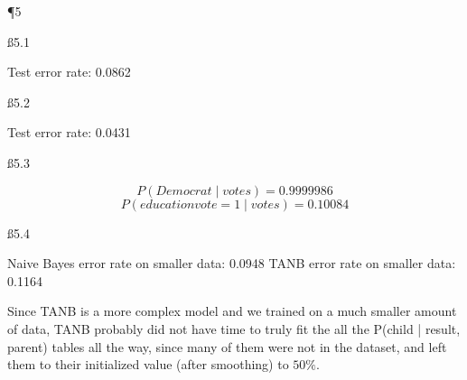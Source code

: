 \P 5

\ss {5.1}

Test error rate: 0.0862

\ss {5.2}

Test error rate: 0.0431

\ss {5.3}

\[ P (Democrat \mid votes) = 0.9999986 \]
\[ P (educationvote=1 \mid votes) = 0.10084 \]

\ss {5.4}

Naive Bayes error rate on smaller data: 0.0948
TANB error rate on smaller data: 0.1164

Since TANB is a more complex model and we trained on a much smaller amount of data, TANB probably did not have time to truly fit the all the P(child | result, parent) tables all the way, since many of them were not in the dataset, and left them to their initialized value (after smoothing) to $50\%$.


